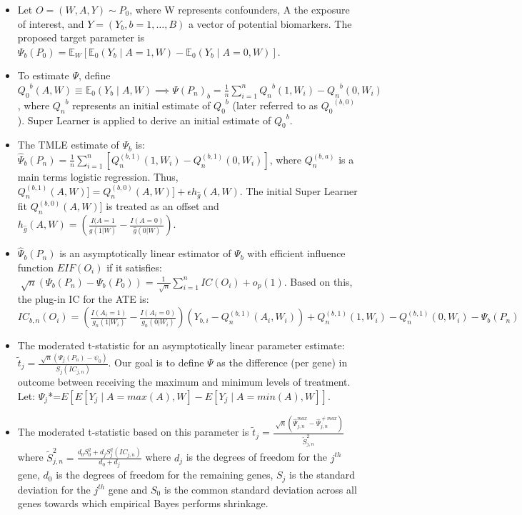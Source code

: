 \documentclass[landscape,a0paper,fontscale=0.285]{baposter} %
\newcommand{\compresslist}{ %
\setlength{\itemsep}{1pt}
\setlength{\parskip}{0pt}
\setlength{\parsep}{0pt}
}
\newcommand{\E}{\mathbb{E}}
\newcommand{\1}{\mathbbm{1}}
\begin{document}
\begin{poster}
{\begin{itemize}\compresslist
  \item Let $O=(W,A,Y)\sim{P_0}$, where W represents confounders, A the exposure
    of interest, and $Y=({Y_b}, b=1,\dots,B)$ a vector of potential biomarkers.
    The proposed target parameter is
    $\Psi_b(P_0)= \E_W[\E_0(Y_b \mid A = 1, W) - \E_0(Y_b \mid A = 0, W)]$.
  \vskip1pt
  \item To estimate $\Psi$, define ${Q_0}^b(A,W) \equiv \E_0(Y_b \mid A, W)
    \implies \Psi(P_n)_b = \frac{1}{n} \sum\limits_{i=1}^n {Q_n}^b(1, W_i) -
    {Q_n}^b(0, W_i)$, where ${Q_n}^b$ represents an initial estimate of
    ${Q_0}^b$ (later referred to as ${Q_0}^{(b,0)}$). Super Learner is applied
    to derive an initial estimate of ${Q_0}^b$.
  \vskip1pt
  \item The TMLE estimate of $\Psi_b$ is: $\hat{\Psi}_b(P_n) = \frac{1}{n}
    \sum\limits_{i=1}^n[Q_n^{(b,1)}(1,W_i)-Q_n^{(b,1)}(0,W_i)]$, where
    $Q_n^{(b,a)}$ is a main terms logistic regression. Thus, $Q_n^{(b,1)}(A, W)]
    =Q_n^{(b,0)}(A,W)] + \epsilon h_{\hat{g}}(A, W)$. The initial Super Learner
    fit $Q_n^{(b,0)}(A,W)]$ is treated as an offset and $h_{\hat{g}}(A,W) =
    (\frac{I(A=1}{\hat{g}(1|W)}- \frac{I(A=0)}{\hat{g}(0|W)})$.
  \vskip1pt
  \item $\hat{\Psi}_b(P_n)$ is an asymptotically linear estimator of $\Psi_b$
    \cite{vdl2011targeted} with efficient influence function $EIF(O_i)$ if it
    satisfies: $\sqrt[]{n} (\Psi_b(P_n) - \Psi_b(P_0)) = \frac{1}{\sqrt[]{n}}
    \sum\limits_{i=1}^n IC(O_i) +o_p(1)$.
  Based on this, the plug-in IC for the ATE is:
  \vskip2pt
  $IC_{b,n}(O_i)=(\frac{I(A_i=1)}{g_n(1|W_i)}-\frac{I(A_i=0)}{g_n(0|W_i)}) (Y_{b,i}-
  Q_n^{(b,1)}(A_i,W_i))+Q_n^{(b,1)}(1,W_i)-Q_n^{(b,1)}(0,W_i)-\Psi_b(P_n)$
  \vskip2pt
  \item The moderated t-statistic \cite{smyth2005limma} for an asymptotically linear 
  parameter estimate: 
  $\tilde{t}_j=\frac{\sqrt[]{n}(\Psi_j(P_n)-\psi_0)}{S_j(IC_{j,n})}$.
  \vskip2pt
  Our goal is to define $\Psi$ as the difference (per gene) in outcome between 
  receiving the maximum and minimum levels of treatment. Let: $\Psi_j$*=$E [ E[Y_j \mid 
  A = max(A), W]- E[Y_j \mid A = min(A), W]]$.
  \vskip1pt
  \item The moderated t-statistic based on this parameter is $\tilde{t}_j=\frac{\sqrt[]{n}
  (\hat{\Psi}_{j,n}^{max}-\hat{\Psi}_{j,n}^{\neq max})}{\tilde{S}_{j,n}^2}$ where 
  $\tilde{S}_{j,n}^2=\frac{d_0S_0^2+d_jS_j^2(IC_{j,n})}{d_0+d_j}$ where $d_j$ is the 
  degrees of freedom for the $j^{th}$ gene, $d_0$ is the degrees of freedom for the 
  remaining genes, $S_j$ is the standard deviation for the $j^{th}$ gene and $S_0$ is 
  the common standard deviation across all genes towards which empirical Bayes performs 
  shrinkage.
\end{itemize}

}


\end{poster}
\end{document}

